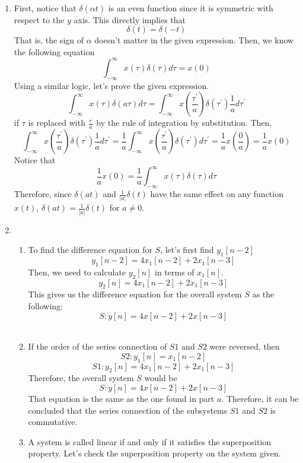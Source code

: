 \documentclass[10pt,a4paper, margin=1in]{article}
\begin{document}
\begin{enumerate}
\item %
    First, notice that $\delta (\alpha t)$ is an even function since it is symmetric with respect to the $y$ axis. This directly implies that
    $$\delta (t)=\delta (-t)$$
    That is, the sign of $\alpha$ doesn't matter in the given expression. Then, we know the following equation
    $$\int_{-\infty}^{\infty}x(\tau)\delta (\tau)d\tau=x(0)$$
    Using a similar logic, let's prove the given expression.
    $$\int_{-\infty}^{\infty}x(\tau)\delta (a\tau)d\tau=\int_{-\infty}^{\infty}x(\frac{\tau^{\prime}}{a})\delta (\tau^{\prime})\frac{1}{a}d\tau^{\prime}$$
    if $\tau$ is replaced with $\frac{\tau^\prime}{a}$ by the rule of integration by substitution. Then,
    $$\int_{-\infty}^{\infty}x(\frac{\tau^{\prime}}{a})\delta (\tau^{\prime})\frac{1}{a}d\tau^{\prime}=\frac{1}{a}\int_{-\infty}^{\infty}x(\frac{\tau^{\prime}}{a})\delta (\tau^{\prime})d\tau^{\prime}=\frac{1}{a}x(\frac{0}{a})=\frac{1}{a}x(0)$$
    Notice that
    $$\frac{1}{a}x(0)=\frac{1}{a}\int_{-\infty}^{\infty}x(\tau)\delta (\tau)d\tau$$
    Therefore, since $\delta (a t)$ and $\frac{1}{|a|}\delta (t)$ have the same effect on any function $x(t)$, $\delta (a t)=\frac{1}{|a|}\delta (t)$ for $a\neq 0$.\\
\item %
    \begin{enumerate}
    \item %
    To find the difference equation for $S$, let's first find $y_1[n-2]$
    $$y_1[n-2]=4x_1[n-2]+2x_1[n-3]$$
    Then, we need to calculate $y_2[n]$ in terms of $x_1[n]$.
    $$y_2[n]=4x_1[n-2]+2x_1[n-3]$$
    This gives us the difference equation for the overall system $S$ as the following:
    $$S:y[n]=4x[n-2]+2x[n-3]$$\\
    \item %
    If the order of the series connection of $S1$ and $S2$ were reversed, then
    $$S2:y_1[n]=x_1[n-2]$$
    $$S1:y_2[n]=4x_1[n-2]+2x_1[n-3]$$
    Therefore, the overall system $S$ would be
    $$S:y[n]=4x[n-2]+2x[n-3]$$
    That equation is the same as the one found in part $a$. Therefore, it can be concluded that the series connection of the subsystems $S1$ and $S2$ is commutative. \\
    \item %
    A system is called linear if and only if it satisfies the superposition property. Let's check the superposition property on the system given.

\end{enumerate}
\end{enumerate}
\end{document}
